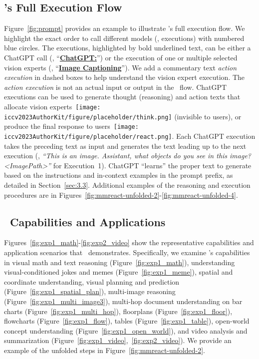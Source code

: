 \subsection{\textbf{\modelname}'s Full Execution Flow}
\label{sec:4.2}
Figure~\ref{fig:prompt} provides an example to illustrate \modelname's full execution flow.
We highlight the exact order to call different models (\ie, executions) with numbered blue circles. The executions, highlighted by bold underlined text, can be either a ChatGPT call (\eg, ``\textbf{\underline{ChatGPT:}}'') or the execution of one or multiple selected vision experts (\eg, ``\textbf{\underline{Image Captioning}}''). We add a commentary text \textit{action execution} in dashed boxes to help understand the vision expert execution. The \textit{action execution} is not an actual input or output in the \modelname~flow. ChatGPT executions can be used to generate thought (reasoning) and action texts that allocate vision experts~\texttt{[image: iccv2023AuthorKit/figure/placeholder/think.png]} (invisible to users), or produce the final response to users~\texttt{[image: iccv2023AuthorKit/figure/placeholder/react.png]}. Each ChatGPT execution takes the preceding text as input and generates the text leading up to the next execution (\eg, \textit{``This is an image. Assistant, what objects do you see
in this image? \textless ImagePath\textgreater''} for Execution~1). ChatGPT ``learns'' the proper text to generate based on the instructions and in-context examples in the prompt prefix, as detailed in Section~\ref{sec:3.3}.
Additional examples of the reasoning and execution procedures are in Figures~\ref{fig:mmreact-unfolded-2}-\ref{fig:mmreact-unfolded-4}.

\subsection{\textbf{\modelname}~Capabilities and Applications}
Figures~\ref{fig:exp1_math}-\ref{fig:exp2_video} show the representative capabilities and application scenarios that \modelname~demonstrates. Specifically, we examine \modelname's capabilities in visual math and text reasoning (Figure~\ref{fig:exp1_math}), understanding visual-conditioned jokes and memes (Figure~\ref{fig:exp1_meme}), spatial and coordinate understanding, visual planning and prediction (Figure~\ref{fig:exp1_spatial_plan}), multi-image reasoning (Figure~\ref{fig:exp1_multi_image3}),  multi-hop document understanding on bar charts (Figure~\ref{fig:exp1_multi_hop}), floorplans (Figure~\ref{fig:exp1_floor}), flowcharts (Figure~\ref{fig:exp1_flow}),  tables (Figure~\ref{fig:exp1_table}), open-world concept understanding (Figure~\ref{fig:exp1_open_world}), and video analysis and summarization (Figure~\ref{fig:exp1_video},~\ref{fig:exp2_video}). We provide an example of the unfolded steps in Figure~\ref{fig:mmreact-unfolded-2}.


